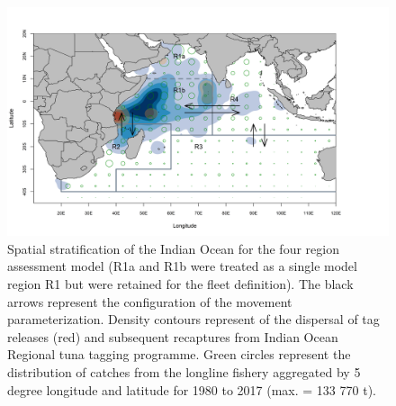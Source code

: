 \documentclass[12pt,halfline,a4paper,nonumbib]{ouparticle}
\begin{document}
\begin{figure}[!ht]
\centering
\includegraphics[width=6in]{figures/map.png}
\caption{Spatial stratification of the Indian Ocean for the four region assessment model (R1a and R1b were treated as a single model region R1 but were retained for the fleet definition). The black arrows represent the configuration of the movement parameterization.  Density contours represent of the dispersal of tag releases (red) and subsequent recaptures from Indian Ocean Regional tuna tagging programme. Green circles represent the distribution of catches from the longline fishery aggregated by 5 degree longitude and latitude for 1980 to 2017 (max. = 133 770 t).}
\label{fig:map}
\end{figure}
\end{document}
